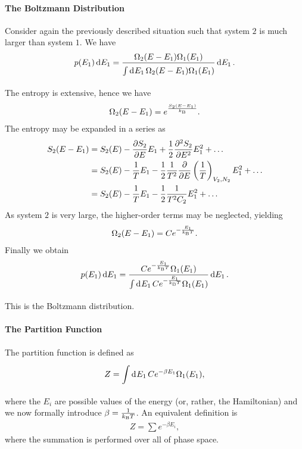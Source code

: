 \paragraph{The Boltzmann Distribution}
Consider again the previously described situation such that system $2$ is much larger than system $1$. We have
\begin{align*}
	p(E_{1})\dd{E_{1}} = \frac{\Omega_{2}(E - E_{1})\Omega_{1}(E_{1})}{\int\limits_{}^{}\dd[]{E_{1}}\Omega_{2}(E - E_{1})\Omega_{1}(E_{1})}\dd{E_{1}}.
\end{align*}
The entropy is extensive, hence we have
\begin{align*}
	\Omega_{2}(E - E_{1}) = e^{\frac{S_{2}(E - E_{1})}{k_{\text{B}}}}.
\end{align*}
The entropy may be expanded in a series as
\begin{align*}
	S_{2}(E - E_{1}) &= S_{2}(E) - \pdv{S_{2}}{E}E_{1} + \frac{1}{2}\pdv[2]{S_{2}}{E}E_{1}^{2} + \dots \\
	                 &= S_{2}(E) - \frac{1}{T}E_{1} - \frac{1}{2}\frac{1}{T^{2}}\pdv{E}\left(\frac{1}{T}\right)_{V_{2}, N_{2}}E_{1}^{2} + \dots \\
	                 &= S_{2}(E) - \frac{1}{T}E_{1} - \frac{1}{2}\frac{1}{T^{2}C_{2}}E_{1}^{2} + \dots
\end{align*}
As system $2$ is very large, the higher-order terms may be neglected, yielding
\begin{align*}
	\Omega_{2}(E - E_{1}) = Ce^{-\frac{E_{1}}{k_{\text{B}} T}}.
\end{align*}
Finally we obtain
\begin{align*}
	p(E_{1})\dd{E_{1}} = \frac{Ce^{-\frac{E_{1}}{k_{\text{B}} T}}\Omega_{1}(E_{1})}{\int\limits_{}^{}\dd[]{E_{1}}Ce^{-\frac{E_{1}}{k_{\text{B}} T}}\Omega_{1}(E_{1})}\dd{E_{1}}.
\end{align*}
This is the Boltzmann distribution.

\paragraph{The Partition Function}
The partition function is defined as
\begin{align*}
	Z = \int\limits_{}^{}\dd[]{E_{1}}Ce^{-\beta E_{1}}\Omega_{1}(E_{1}),
\end{align*}
where the $E_{i}$ are possible values of the energy (or, rather, the Hamiltonian) and we now formally introduce $\beta = \frac{1}{k_{\text{B}} T}$. An equivalent definition is
\begin{align*}
	Z = \sum e^{-\beta E_{i}},
\end{align*}
where the summation is performed over all of phase space.

